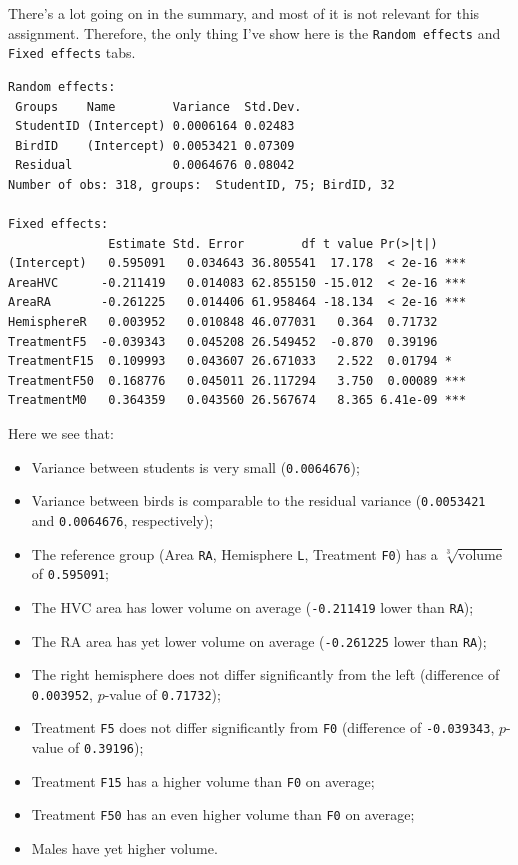\documentclass[
]{book}
\providecommand{\tightlist}{%
  \setlength{\itemsep}{0pt}\setlength{\parskip}{0pt}}
\begin{document}
There's a lot going on in the summary, and most of it is not relevant for this assignment. Therefore, the only thing I've show here is the \texttt{Random\ effects} and \texttt{Fixed\ effects} tabs.

\begin{verbatim}
Random effects:
 Groups    Name        Variance  Std.Dev.
 StudentID (Intercept) 0.0006164 0.02483 
 BirdID    (Intercept) 0.0053421 0.07309 
 Residual              0.0064676 0.08042 
Number of obs: 318, groups:  StudentID, 75; BirdID, 32

Fixed effects:
              Estimate Std. Error        df t value Pr(>|t|)    
(Intercept)   0.595091   0.034643 36.805541  17.178  < 2e-16 ***
AreaHVC      -0.211419   0.014083 62.855150 -15.012  < 2e-16 ***
AreaRA       -0.261225   0.014406 61.958464 -18.134  < 2e-16 ***
HemisphereR   0.003952   0.010848 46.077031   0.364  0.71732    
TreatmentF5  -0.039343   0.045208 26.549452  -0.870  0.39196    
TreatmentF15  0.109993   0.043607 26.671033   2.522  0.01794 *  
TreatmentF50  0.168776   0.045011 26.117294   3.750  0.00089 ***
TreatmentM0   0.364359   0.043560 26.567674   8.365 6.41e-09 ***
\end{verbatim}

Here we see that:

\begin{itemize}
\tightlist
\item
  Variance between students is very small (\texttt{0.0064676});
\item
  Variance between birds is comparable to the residual variance (\texttt{0.0053421} and \texttt{0.0064676}, respectively);
\item
  The reference group (Area \texttt{RA}, Hemisphere \texttt{L}, Treatment \texttt{F0}) has a \(\sqrt[3]{\text{volume}}\) of \texttt{0.595091};
\item
  The HVC area has lower volume on average (\texttt{-0.211419} lower than \texttt{RA});
\item
  The RA area has yet lower volume on average (\texttt{-0.261225} lower than \texttt{RA});
\item
  The right hemisphere does not differ significantly from the left (difference of \texttt{0.003952}, \(p\)-value of \texttt{0.71732});
\item
  Treatment \texttt{F5} does not differ significantly from \texttt{F0} (difference of \texttt{-0.039343}, \(p\)-value of \texttt{0.39196});
\item
  Treatment \texttt{F15} has a higher volume than \texttt{F0} on average;
\item
  Treatment \texttt{F50} has an even higher volume than \texttt{F0} on average;
\item
  Males have yet higher volume.
\end{itemize}
\end{document}
